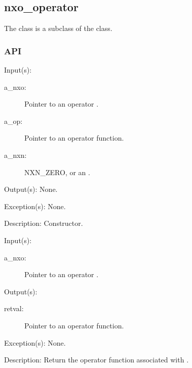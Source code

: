 %
%
%
%
%

\subsection{nxo\_operator}
\label{nxo_operator}

The  class is a subclass of the  class.

\subsubsection{API}
\begin{capi}
\label{nxo_operator_new}
	\begin{capilist}
	\item[Input(s): ]
		\begin{description}\item[]
		\item[a\_nxo: ]
			Pointer to an operator .
		\item[a\_op: ]
			Pointer to an operator function.
		\item[a\_nxn: ]
			NXN\_ZERO, or an .
		\end{description}
	\item[Output(s): ] None.
	\item[Exception(s): ] None.
	\item[Description: ]
		Constructor.
	\end{capilist}
\label{nxo_operator_f}
	\begin{capilist}
	\item[Input(s): ]
		\begin{description}\item[]
		\item[a\_nxo: ]
			Pointer to an operator \classname{nxo}.
		\end{description}
	\item[Output(s): ]
		\begin{description}\item[]
		\item[retval: ]
			Pointer to an operator function.
		\end{description}
	\item[Exception(s): ] None.
	\item[Description: ]
		Return the operator function associated with \cvar{a\_nxo}.
	\end{capilist}
\end{capi}
